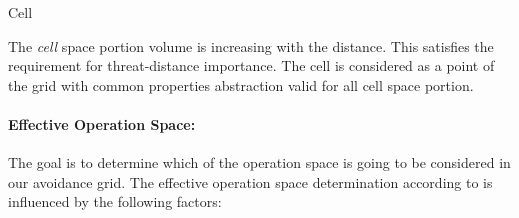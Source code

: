 \begin{definition}{Cell}
\end{definition}

\begin{note}
    The \emph{cell} space portion volume is increasing with the distance. This satisfies the requirement for threat-distance importance.  The cell is considered as a point of the grid with common properties abstraction valid for all cell space portion.    
\end{note}

\paragraph{Effective Operation Space:} The goal is to determine which of the operation space is going to be considered in our avoidance grid.  The effective operation space determination according to \cite{zaiane2002clustering} is influenced by the following factors:

